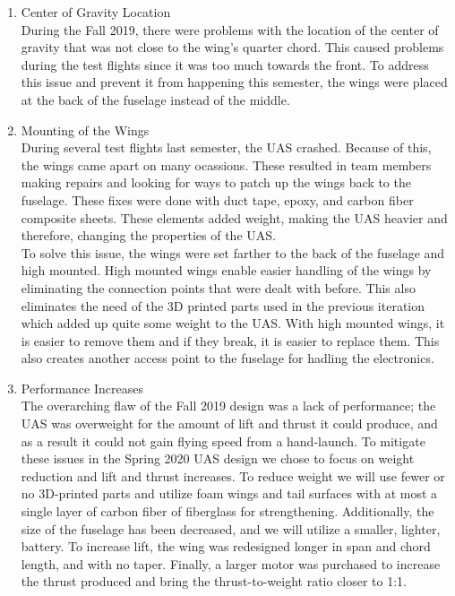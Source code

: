 \documentclass{article}
\begin{document}
\begin{enumerate}
  \item{Center of Gravity Location}\\
  During the Fall 2019, there were problems with the location of the center of gravity that was not close to the wing's quarter chord. This caused problems during the test flights since it was too much towards the front. To address this issue and prevent it from happening this semester, the wings were placed at the back of the fuselage instead of the middle.\\
  
  \item{Mounting of the Wings}\\
  During several test flights last semester, the UAS crashed. Because of this, the wings came apart on many ocassions. These resulted in team members making repairs and looking for ways to patch up the wings back to the fuselage. These fixes were done with duct tape, epoxy, and carbon fiber composite sheets. These elements added weight, making the UAS heavier and therefore, changing the properties of the UAS.\\
  To solve this issue, the wings were set farther to the back of the fuselage and high mounted. High mounted wings enable easier handling of the wings by eliminating the connection points that were dealt with before. This also eliminates the need of the 3D printed parts used in the previous iteration which added up quite some weight to the UAS. With high mounted wings, it is easier to remove them and if they break, it is easier to replace them. This also creates another access point to the fuselage for hadling the electronics.\\
  
  \item{Performance Increases}\\
  The overarching flaw of the Fall 2019 design was a lack of performance; the UAS was overweight for the amount of lift and thrust it could produce, and as a result it could not gain flying speed from a hand-launch. To mitigate these issues in the Spring 2020 UAS design we chose to focus on weight reduction and lift and thrust increases. To reduce weight we will use fewer or no 3D-printed parts and utilize foam wings and tail surfaces with at most a single layer of carbon fiber of fiberglass for strengthening. Additionally, the size of the fuselage has been decreased, and we will utilize a smaller, lighter, battery. To increase lift, the wing was redesigned longer in span and chord length, and with no taper. Finally, a larger motor was purchased to increase the thrust produced and bring the thrust-to-weight ratio closer to 1:1. \\

\end{enumerate}
\end{document}
